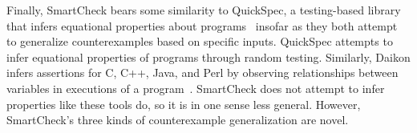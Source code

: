 \documentclass{sigplanconf}
\newcommand{\ttp}[1]{\texttt{#1}}
\begin{document}


Finally, SmartCheck bears some similarity to QuickSpec, a testing-based library
that infers equational properties about programs~\cite{qs} insofar as they both
attempt to generalize counterexamples based on specific inputs.  QuickSpec
attempts to infer equational properties of programs through random testing.
Similarly, Daikon infers assertions for C, C++, Java, and Perl by observing
relationships between variables in executions of a program~\cite{daikon}.
SmartCheck does not attempt to infer properties like these tools do, so it is in
one sense less general.  However, SmartCheck's three kinds of counterexample
generalization are novel.


\end{document}
